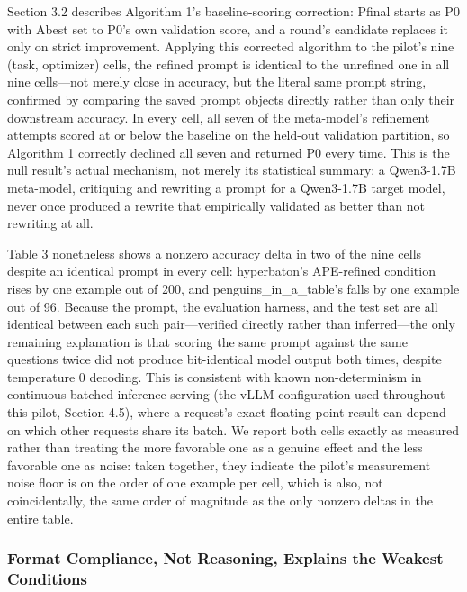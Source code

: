 \documentclass[a4paper,fleqn]{cas-sc}
\begin{document}
Section 3.2 describes Algorithm 1's baseline-scoring correction: Pfinal starts as P0 with Abest set to P0's own validation score, and a round's candidate replaces it only on strict improvement. Applying this corrected algorithm to the pilot's nine (task, optimizer) cells, the refined prompt is identical to the unrefined one in all nine cells---not merely close in accuracy, but the literal same prompt string, confirmed by comparing the saved prompt objects directly rather than only their downstream accuracy. In every cell, all seven of the meta-model's refinement attempts scored at or below the baseline on the held-out validation partition, so Algorithm 1 correctly declined all seven and returned P0 every time. This is the null result's actual mechanism, not merely its statistical summary: a Qwen3-1.7B meta-model, critiquing and rewriting a prompt for a Qwen3-1.7B target model, never once produced a rewrite that empirically validated as better than not rewriting at all.

Table 3 nonetheless shows a nonzero accuracy delta in two of the nine cells despite an identical prompt in every cell: hyperbaton's APE-refined condition rises by one example out of 200, and penguins\_\allowbreak{}in\_\allowbreak{}a\_\allowbreak{}table's falls by one example out of 96. Because the prompt, the evaluation harness, and the test set are all identical between each such pair---verified directly rather than inferred---the only remaining explanation is that scoring the same prompt against the same questions twice did not produce bit-identical model output both times, despite temperature 0 decoding. This is consistent with known non-determinism in continuous-batched inference serving (the vLLM configuration used throughout this pilot, Section 4.5), where a request's exact floating-point result can depend on which other requests share its batch. We report both cells exactly as measured rather than treating the more favorable one as a genuine effect and the less favorable one as noise: taken together, they indicate the pilot's measurement noise floor is on the order of one example per cell, which is also, not coincidentally, the same order of magnitude as the only nonzero deltas in the entire table.

\subsubsection{Format Compliance, Not Reasoning, Explains the Weakest Conditions}
\end{document}
